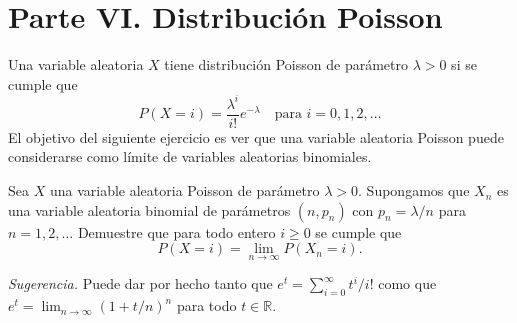 \documentclass[12pt,a4paper]{article}
\begin{document}
    \section*{Parte VI. Distribución Poisson}

    Una variable aleatoria $X$ tiene distribución Poisson de parámetro $\lambda > 0$ si se cumple que
    \begin{equation*}
        P(X = i) = \frac{\lambda^i}{i!} e^{-\lambda} \quad \text{para } i = 0, 1, 2, \ldots
    \end{equation*}
    El objetivo del siguiente ejercicio es ver que una variable aleatoria Poisson puede considerarse como
    límite de variables aleatorias binomiales.

    \begin{mdframed}[style=mdpinkbox, frametitle={Ejercicio 7}]
        Sea $X$ una variable aleatoria Poisson de parámetro $\lambda > 0$. Supongamos que $X_n$ es una
        variable aleatoria binomial de parámetros $(n, p_n)$ con $p_n = \lambda/n$ para $n = 1, 2, \ldots$
        Demuestre que para todo entero $i \geq 0$ se cumple que
        \begin{equation*}
            P(X = i) = \lim_{n \to \infty} P(X_n = i).
        \end{equation*}

        \medskip
        \noindent\textit{Sugerencia.} Puede dar por hecho tanto que
        $e^t = \sum_{i=0}^{\infty} t^i / i!$ como que $e^t = \lim_{n\to\infty}(1 + t/n)^n$
        para todo $t \in \mathbb{R}$.
    \end{mdframed}
\end{document}
